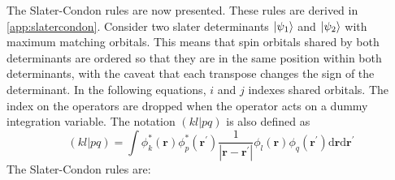 \documentclass[final,3p,times,twocolumn]{elsarticle}
\begin{document}
The Slater-Condon rules are now presented. These rules are derived in \ref{app:slatercondon}. Consider two slater determinants $\ket{\psi_1}$ and $\ket{\psi_2}$ with maximum matching orbitals. This means that spin orbitals shared by both determinants are ordered so that they are in the same position within both determinants, with the caveat that each transpose changes the sign of the determinant. In the following equations, $i$ and $j$ indexes shared orbitals. The index on the operators are dropped when the operator acts on a dummy integration variable. The notation $(kl|pq)$ is also defined as
\begin{equation}
(kl|pq) = \int \phi_k^*(\mathbf{r})\phi_p^*(\mathbf{r}^\prime) \frac{1}{|\mathbf{r}-\mathbf{r}^\prime|} \phi_l(\mathbf{r}) \phi_q(\mathbf{r}^\prime) \mathrm{d}\mathbf{r}\mathrm{d}\mathbf{r}^\prime 
\end{equation}
The Slater-Condon rules are:
\end{document}

